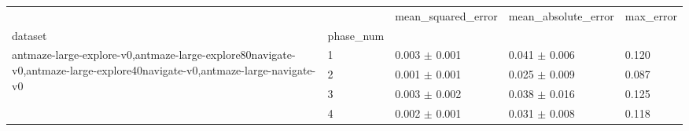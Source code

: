 \begin{tabular}{lllll}
\toprule
 &  & mean_squared_error & mean_absolute_error & max_error \\
dataset & phase_num &  &  &  \\
\midrule
\multirow[t]{4}{*}{antmaze-large-explore-v0,antmaze-large-explore80navigate-v0,antmaze-large-explore40navigate-v0,antmaze-large-navigate-v0} & 1 & 0.003 $\pm$ 0.001 & 0.041 $\pm$ 0.006 & 0.120 \\
 & 2 & 0.001 $\pm$ 0.001 & 0.025 $\pm$ 0.009 & 0.087 \\
 & 3 & 0.003 $\pm$ 0.002 & 0.038 $\pm$ 0.016 & 0.125 \\
 & 4 & 0.002 $\pm$ 0.001 & 0.031 $\pm$ 0.008 & 0.118 \\
\cline{1-5}
\bottomrule
\end{tabular}
